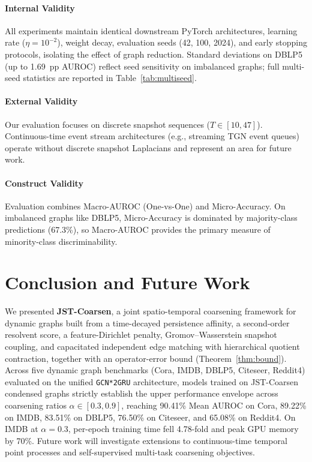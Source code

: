 \documentclass[sigconf]{acmart}
\begin{document}
\paragraph{Internal Validity}
All experiments maintain identical downstream PyTorch architectures, learning rate ($\eta = 10^{-2}$), weight decay, evaluation seeds (42, 100, 2024), and early stopping protocols, isolating the effect of graph reduction. Standard deviations on DBLP5 (up to 1.69~pp AUROC) reflect seed sensitivity on imbalanced graphs; full multi-seed statistics are reported in Table~\ref{tab:multiseed}.

\paragraph{External Validity}
Our evaluation focuses on discrete snapshot sequences ($T \in [10, 47]$). Continuous-time event stream architectures (e.g., streaming TGN event queues) operate without discrete snapshot Laplacians and represent an area for future work.

\paragraph{Construct Validity}
Evaluation combines Macro-AUROC (One-vs-One) and Micro-Accuracy. On imbalanced graphs like DBLP5, Micro-Accuracy is dominated by majority-class predictions (67.3\%), so Macro-AUROC provides the primary measure of minority-class discriminability.

\section{Conclusion and Future Work}
\label{sec:conclusion}
We presented \textbf{JST-Coarsen}, a joint spatio-temporal coarsening framework for dynamic graphs built from a time-decayed persistence affinity, a second-order resolvent score, a feature-Dirichlet penalty, Gromov--Wasserstein snapshot coupling, and capacitated independent edge matching with hierarchical quotient contraction, together with an operator-error bound (Theorem~\ref{thm:bound}). Across five dynamic graph benchmarks (Cora, IMDB, DBLP5, Citeseer, Reddit4) evaluated on the unified \texttt{GCN*2GRU} architecture, models trained on JST-Coarsen condensed graphs strictly establish the upper performance envelope across coarsening ratios $\alpha \in [0.3, 0.9]$, reaching 90.41\% Mean AUROC on Cora, 89.22\% on IMDB, 83.51\% on DBLP5, 76.50\% on Citeseer, and 65.08\% on Reddit4. On IMDB at $\alpha = 0.3$, per-epoch training time fell 4.78-fold and peak GPU memory by 70\%. Future work will investigate extensions to continuous-time temporal point processes and self-supervised multi-task coarsening objectives.
\end{document}
